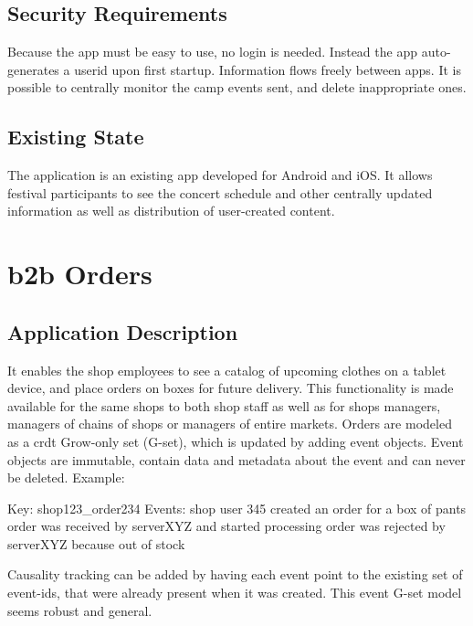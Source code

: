 \documentclass[11pt,a4paper]{report}
\begin{document}
\subsection{Security Requirements}
Because the app must be easy to use, no login is needed. Instead the app auto-generates a userid upon first startup.
Information flows freely between apps.
It is possible to centrally monitor the camp events sent, and delete inappropriate ones.

\subsection{Existing State}
The application is an existing app developed for Android and iOS. It allows festival participants to see the concert schedule and other centrally updated information as well as distribution of user-created content.


\section{\gls{b2b} Orders}
\subsection{Application Description}
It enables the shop employees to see a catalog of upcoming clothes on a tablet device, and place orders on boxes for future delivery. This functionality is made available for the same shops to both shop staff as well as for shops managers, managers of chains of shops or managers of entire markets.
Orders are modeled as a \gls{crdt} Grow-only set (G-set), which is updated by adding event objects. Event objects are immutable, contain data and metadata about the event and can never be deleted. Example:

Key: shop123\_order234
Events:
shop user 345 created an order for a box of pants
order was received by serverXYZ and started processing
order was rejected by serverXYZ because out of stock

Causality tracking can be added by having each event point to the existing set of event-ids, that were already present when it was created. This event G-set model seems robust and general.
\end{document}
